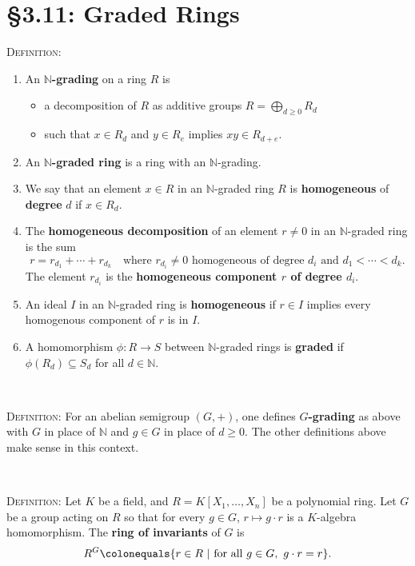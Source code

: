 \documentclass[12pt]{amsart}
\newcommand{\N}{\mathbb{N}}
\newcommand{\1}{\mathbbm{1}}
\newcommand{\showsol}[1]{\def\displaysol{#1}}
\newcommand\ceq{\colonequals}
\begin{document}
\showsol{1}
	
	\thispagestyle{empty}
	
	\section*{\S3.11: Graded Rings}	

\begin{framed}

\noindent \textsc{Definition:} 
\begin{enumerate}
\item An \textbf{$\N$-grading} on a ring $R$ is 
\begin{itemize}
\item a decomposition of $R$ as additive groups $R= \bigoplus_{d\geq 0} R_d$
\item such that $x\in R_d$ and $y\in R_e$ implies $xy\in R_{d+e}$. 
\end{itemize}
\item An \textbf{$\N$-graded ring} is a ring with an $\N$-grading.

\item We say that an element $x\in R$ in an $\N$-graded ring $R$ is \textbf{homogeneous} of \textbf{degree} $d$ if $x\in R_d$.

\item The \textbf{homogeneous decomposition} of an element $r\neq 0$ in an $\N$-graded ring is the sum
\[ r = r_{d_1} + \cdots + r_{d_k} \quad \text{where $r_{d_i}\neq 0$ homogeneous of degree $d_i$ and $d_1<\cdots < d_k$}.\]
The element $r_{d_i}$ is the \textbf{homogeneous component $r$ of degree $d_i$}.

\item An ideal $I$ in an $\N$-graded ring is \textbf{homogeneous} if $r\in I$ implies every homogenous component of $r$ is in $I$.
\item A homomorphism $\phi:R\to S$ between $\N$-graded rings is \textbf{graded} if $\phi(R_d) \subseteq S_d$ for all $d\in \N$.
\end{enumerate}

\

\noindent \textsc{Definition:} For an abelian semigroup $(G,+)$, one defines \textbf{$G$-grading} as above with $G$ in place of $\N$ and $g\in G$ in place of $d\geq 0$. The other definitions above make sense in this context.

\


\noindent \textsc{Definition:} Let $K$ be a field, and $R=K[X_1,\dots,X_n]$ be a polynomial ring. Let $G$ be a group acting on $R$ so that for every $g\in G$,  $r\mapsto g\cdot r$ is a $K$-algebra homomorphism. The \textbf{ring of invariants} of $G$ is
\[ R^G \ceq \{ r\in R \ | \ \text{for all} \ g\in G, \ g\cdot r = r \}.\]
 \end{framed}
\end{document}
